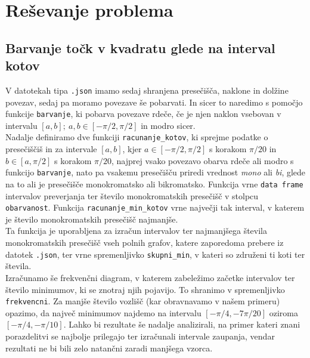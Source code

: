 \documentclass[12pt, a4paper]{article}
\begin{document}
	\section{Reševanje problema}
	\subsection{Barvanje točk v kvadratu glede na interval kotov}
	V datotekah tipa \texttt{.json} imamo sedaj shranjena presečišča, naklone in dolžine povezav, sedaj pa moramo povezave še pobarvati. In sicer to naredimo s pomočjo funkcije \texttt{barvanje}, ki pobarva povezave rdeče, če je njen naklon vsebovan v intervalu $\left[{a,b}\right]; \ a,b \in \left[{-\pi/2,\pi/2}\right]$ in modro sicer. \\
	Nadalje definiramo dve funkciji \texttt{racunanje\_kotov}, ki sprejme podatke o presečiščiš in za intervale $\left[{a,b}\right]$, kjer $a \in \left[{-\pi/2, \pi/2}\right]$ s korakom $\pi/20$ in $b \in \left[{a, \pi/2}\right]$ s korakom $\pi/20$, najprej vsako povezavo obarva rdeče ali modro s funkcijo \texttt{barvanje}, nato pa vsakemu presečišču priredi vrednost \textit{mono} ali \textit{bi}, glede na to ali je presečišče monokromatsko ali bikromatsko. Funkcija vrne \texttt{data frame} intervalov preverjanja ter število monokromatskih presečišč v stolpcu \texttt{obarvanost}. Funkcija \texttt{racunanje\_min\_kotov} vrne največji tak interval, v katerem je število monokromatskih presečišč najmanjše. \\
	Ta funkcija je uporabljena za izračun intervalov ter najmanjšega števila monokromatskih presečišč vseh polnih grafov, katere zaporedoma prebere iz datotek \texttt{.json}, ter vrne spremenljivko \texttt{skupni\_min}, v kateri so združeni ti koti ter števila. \\
	Izračunamo še frekvenčni diagram, v katerem zabeležimo začetke intervalov ter število minimumov, ki se znotraj njih pojavijo. To shranimo v spremenljivko \texttt{frekvencni}. Za manjše število vozlišč (kar obravnavamo v našem primeru) opazimo, da največ minimumov najdemo na intervalu $\left[{-\pi/4, -7\pi/20}\right]$ oziroma $\left[{-\pi/4, -\pi/10}\right]$. Lahko bi rezultate še nadalje analizirali, na primer kateri znani porazdelitvi se najbolje prilegajo ter izračunali intervale zaupanja, vendar rezultati ne bi bili zelo natančni zaradi manjšega vzorca. \newpage
\end{document}
